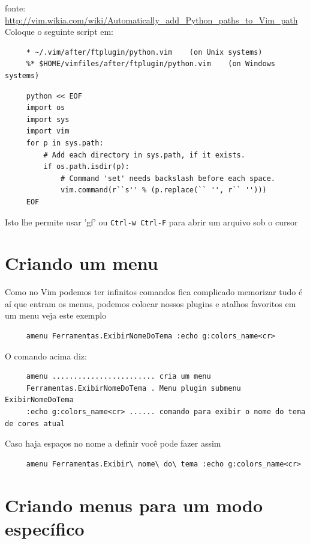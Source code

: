 \documentclass[10pt,a4paper,openany]{book}
\begin{document}
fonte:
\url{http://vim.wikia.com/wiki/Automatically_add_Python_paths_to_Vim_path}
Coloque o seguinte script em:

\begin{verbatim}
     * ~/.vim/after/ftplugin/python.vim    (on Unix systems)
     %* $HOME/vimfiles/after/ftplugin/python.vim    (on Windows systems)
\end{verbatim}

\begin{verbatim}
     python << EOF
     import os
     import sys
     import vim
     for p in sys.path:
         # Add each directory in sys.path, if it exists.
         if os.path.isdir(p):
             # Command 'set' needs backslash before each space.
             vim.command(r``s'' % (p.replace(`` '', r`` '')))
     EOF
\end{verbatim}

Isto lhe permite usar 'gf' ou {\tt Ctrl-w Ctrl-F} para abrir um arquivo sob o cursor

\section{Criando um menu}
\label{Criando um menu}

Como no Vim podemos ter infinitos comandos fica complicado memorizar tudo
é aí que entram os menus, podemos colocar nossos plugins e atalhos favoritos
em um menu veja este exemplo

\begin{verbatim}
     amenu Ferramentas.ExibirNomeDoTema :echo g:colors_name<cr>
\end{verbatim}

O comando acima diz:

\begin{verbatim}
     amenu ........................ cria um menu
     Ferramentas.ExibirNomeDoTema . Menu plugin submenu ExibirNomeDoTema
     :echo g:colors_name<cr> ...... comando para exibir o nome do tema de cores atual
\end{verbatim}

Caso haja espaços no nome a definir você pode fazer assim

\begin{verbatim}
     amenu Ferramentas.Exibir\ nome\ do\ tema :echo g:colors_name<cr>
\end{verbatim}

\section{Criando menus para um modo específico}
\label{Criando menus para um modo específico}
\end{document}
